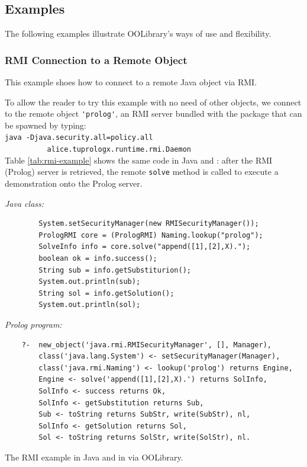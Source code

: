 

\subsection{Examples}

The following examples illustrate OOLibrary's ways of use and flexibility.

\subsubsection{RMI Connection to a Remote Object}

This example shoes how to connect to a remote Java object via RMI.

To allow the reader to try this example with no need of other objects, we connect to the remote object \verb|'prolog'|, an RMI server bundled with the \tuprolog{} package that can be spawned by typing:\\

{\small\texttt{java -Djava.security.all=policy.all\\
\mbox{~~~~~~~~~~}alice.tuprologx.runtime.rmi.Daemon}}\\

\noindent Table \ref{tab:rmi-example} shows the same code in Java and \tuprolog{}:
after the RMI (Prolog) server is retrieved, the remote \texttt{solve} method is called to execute a demonstration onto the Prolog server.

\begin{table}
\textit{Java class:}
\begin{verbatim}
        System.setSecurityManager(new RMISecurityManager());
        PrologRMI core = (PrologRMI) Naming.lookup("prolog");
        SolveInfo info = core.solve("append([1],[2],X).");
        boolean ok = info.success();
        String sub = info.getSubstiturion();
        System.out.println(sub);
        String sol = info.getSolution();
        System.out.println(sol);
\end{verbatim}
\textit{Prolog program:}
\begin{verbatim}
    ?-  new_object('java.rmi.RMISecurityManager', [], Manager),
        class('java.lang.System') <- setSecurityManager(Manager),
        class('java.rmi.Naming') <- lookup('prolog') returns Engine,
        Engine <- solve('append([1],[2],X).') returns SolInfo,
        SolInfo <- success returns Ok,
        SolInfo <- getSubstitution returns Sub,
        Sub <- toString returns SubStr, write(SubStr), nl,
        SolInfo <- getSolution returns Sol,
        Sol <- toString returns SolStr, write(SolStr), nl.
\end{verbatim}

\caption{The RMI example in Java and in \tuprolog{} via OOLibrary.}
\label{tab:rmi-example}
\end{table}

